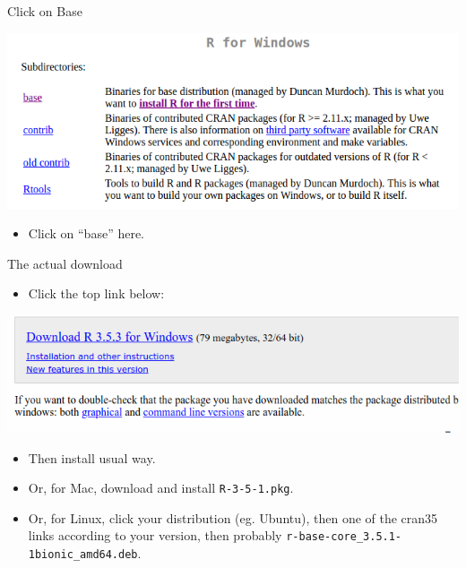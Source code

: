 \documentclass[
  ignorenonframetext,
]{beamer}
\providecommand{\tightlist}{%
  \setlength{\itemsep}{0pt}\setlength{\parskip}{0pt}}
\begin{document}
\begin{frame}{Click on Base}
\protect\hypertarget{click-on-base}{}

\includegraphics{r33.png}

\begin{itemize}
\tightlist
\item
  Click on ``base'' here.
\end{itemize}

\end{frame}

\begin{frame}[fragile]{The actual download}
\protect\hypertarget{the-actual-download}{}

\begin{itemize}
\tightlist
\item
  Click the top link below:
\end{itemize}

\includegraphics{dlr35.png}

\begin{itemize}
\tightlist
\item
  Then install usual way.
\item
  Or, for Mac, download and install \texttt{R-3-5-1.pkg}.
\item
  Or, for Linux, click your distribution (eg. Ubuntu), then one of the
  cran35 links according to your version, then probably
  \texttt{r-base-core\_3.5.1-1bionic\_amd64.deb}.
\end{itemize}

\end{frame}
\end{document}
